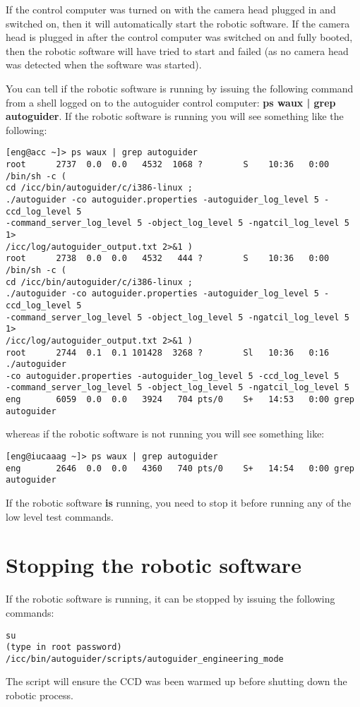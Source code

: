 \documentclass[10pt,a4paper]{article}
\begin{document}
If the control computer was turned on with the camera head plugged in and switched on, then it will automatically start the robotic software. If the camera head is plugged in after the control computer was switched on and fully booted, then the robotic software will have tried to start and failed (as no camera head was detected when the software was started).

You can tell if the robotic software is running by issuing the following command from a shell logged on to the autoguider control computer: {\bf ps waux | grep autoguider}. If the robotic software is running you will see something like the following:
\begin{verbatim}
[eng@acc ~]> ps waux | grep autoguider
root      2737  0.0  0.0   4532  1068 ?        S    10:36   0:00 /bin/sh -c ( 
cd /icc/bin/autoguider/c/i386-linux ; 
./autoguider -co autoguider.properties -autoguider_log_level 5 -ccd_log_level 5 
-command_server_log_level 5 -object_log_level 5 -ngatcil_log_level 5 1> 
/icc/log/autoguider_output.txt 2>&1 )
root      2738  0.0  0.0   4532   444 ?        S    10:36   0:00 /bin/sh -c ( 
cd /icc/bin/autoguider/c/i386-linux ; 
./autoguider -co autoguider.properties -autoguider_log_level 5 -ccd_log_level 5 
-command_server_log_level 5 -object_log_level 5 -ngatcil_log_level 5 1> 
/icc/log/autoguider_output.txt 2>&1 )
root      2744  0.1  0.1 101428  3268 ?        Sl   10:36   0:16 ./autoguider 
-co autoguider.properties -autoguider_log_level 5 -ccd_log_level 5 
-command_server_log_level 5 -object_log_level 5 -ngatcil_log_level 5
eng       6059  0.0  0.0   3924   704 pts/0    S+   14:53   0:00 grep autoguider
\end{verbatim}
whereas if the robotic software is not running you will see something like:
\begin{verbatim}
[eng@iucaaag ~]> ps waux | grep autoguider
eng       2646  0.0  0.0   4360   740 pts/0    S+   14:54   0:00 grep autoguider
\end{verbatim}

If the robotic software {\bf is} running, you need to stop it before running any of the low level test commands.

\section{Stopping the robotic software}

If the robotic software is running, it can be stopped by issuing the following commands:
\begin{verbatim}
su
(type in root password)
/icc/bin/autoguider/scripts/autoguider_engineering_mode
\end{verbatim}
The script will ensure the CCD was been warmed up before shutting down the robotic process.
\end{document}
